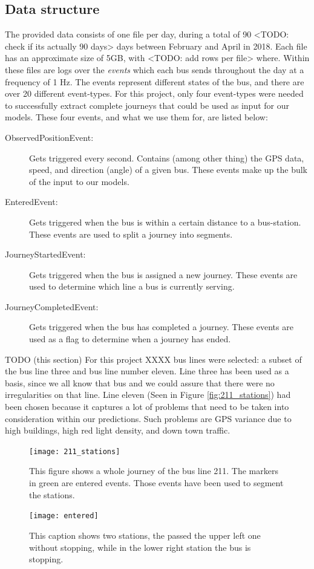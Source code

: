 \subsection{Data structure}
The provided data consists of one file per day, during a total of 90 <TODO: check if its actually 90 days> days between February and April in 2018. Each file has an approximate size of 5GB, with <TODO: add rows per file> where. Within these files are logs over the \textit{events} which each bus sends throughout the day at a frequency of 1 Hz. The events represent different states of the bus, and there are over 20 different event-types. For this project, only four event-types were needed to successfully extract complete journeys that could be used as input for our models. These four events, and what we use them for, are listed below:\\
\begin{description}
\item[ObservedPositionEvent:] Gets triggered every second. Contains (among other thing) the GPS data, speed, and direction (angle) of a given bus. These events make up the bulk of the input to our models.
\item[EnteredEvent:] Gets triggered when the bus is within a certain distance to a bus-station. These events are used to split a journey into segments.
\item[JourneyStartedEvent:] Gets triggered when the bus is assigned a new journey. These events are used to determine which line a bus is currently serving.
\item[JourneyCompletedEvent:] Gets triggered when the bus has completed a journey. These events are used as a flag to determine when a journey has ended.
\end{description}

TODO (this section) For this project XXXX bus lines were selected: a subset of the bus line three and bus line number eleven. Line three has been used as a basis, since we all know that bus and we could assure that there were no irregularities on that line. Line eleven (Seen in Figure \ref{fig:211_stations}) had been chosen because it captures a lot of problems that need to be taken into consideration within our predictions. Such problems are GPS variance due to high buildings, high red light density, and down town traffic. 

\begin{figure}[t!]
\begin{minipage}{.5\textwidth}
	\texttt{[image: 211\_stations]}
	\caption{This figure shows a whole journey of the bus line 211. The markers in green are entered events. Those events have been used to segment the stations.}
	\label{fig:211_stations}
\end{minipage}
\hspace{5pt}
\begin{minipage}{.48\textwidth}
\texttt{[image: entered]}
\caption{This caption shows two stations,  the passed the upper left one without stopping, while in the lower right station the bus is stopping.}
\label{fig:entered}
\end{minipage}
\end{figure}


